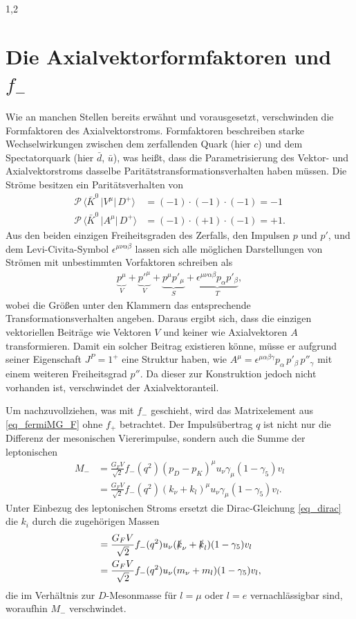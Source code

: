 \documentclass[11pt,a4paper,twoside]{report}
\begin{document}
\begin{spacing}{1,2}
\section{Die Axialvektorformfaktoren und $f_-$}
Wie an manchen Stellen bereits erwähnt und vorausgesetzt, verschwinden die Formfaktoren des Axialvektorstroms. Formfaktoren beschreiben starke 
Wechselwirkungen zwischen dem zerfallenden Quark (hier $c$) und dem Spectatorquark (hier $\bar d$, $\bar u$), was heißt, dass die Parametrisierung des 
Vektor- und Axialvektorstroms dasselbe Paritätstransformationsverhalten haben müssen. Die Ströme besitzen ein Paritätsverhalten von
\begin{align}
 \mathcal{P} \, \big\langle\bar K^0\,\big|V^\mu|\,D^+\big\rangle &= (-1)\cdot(-1)\cdot(-1) = -1 \nonumber \\
 \mathcal{P} \, \big\langle\bar K^0\,\big|A^\mu|\,D^+\big\rangle &= (-1)\cdot(+1)\cdot(-1) = +1. \nonumber
\end{align}
Aus den beiden einzigen Freiheitsgraden des Zerfalls, den Impulsen $p$ und $p'$, und dem Levi-Civita-Symbol $\epsilon^{\mu\nu\alpha\beta}$ lassen sich alle möglichen
Darstellungen von Strömen mit unbestimmten Vorfaktoren schreiben als
\begin{align}
 \underbrace{p^\mu}_{V} + \underbrace{p'^\mu}_{V}+ \underbrace{p^\mu p'_\mu }_{S} + \underbrace{\epsilon^{\mu\nu\alpha\beta}p_\alpha p'_\beta}_{T},
\end{align}
wobei die Größen unter den Klammern das entsprechende Transformationsverhalten angeben. Daraus ergibt sich, dass die einzigen vektoriellen Beiträge wie 
Vektoren $V$ und keiner wie Axialvektoren $A$ transformieren. Damit ein solcher Beitrag existieren könne, müsse er aufgrund seiner Eigenschaft $J^P = 1^+$
eine Struktur haben, wie $A^\mu = \epsilon^{\mu\alpha\beta\gamma}p_\alpha\,p'_\beta\,p''_\gamma$ mit einem weiteren Freiheitsgrad $p''$. Da dieser zur 
Konstruktion jedoch nicht vorhanden ist, verschwindet der Axialvektoranteil.

\noindent
Um nachzuvollziehen, was mit $f_-$ geschieht, wird das Matrixelement aus \eqref{eq_fermiMG_F} ohne $f_+$ betrachtet. Der Impulsübertrag $q$ ist nicht
nur die Differenz der mesonischen Viererimpulse, sondern auch die Summe der leptonischen
\begin{align}
 M_- &= \frac{G_F V}{\sqrt{2}} f_-(q^2)(p_D-p_K)^\mu u_\nu \gamma_\mu(1-\gamma_5)v_l\nonumber\\
 &= \frac{G_F V}{\sqrt{2}} f_-(q^2)(k_\nu+k_l)^\mu u_\nu \gamma_\mu(1-\gamma_5)v_l.\nonumber
\end{align}
Unter Einbezug des leptonischen Stroms ersetzt die Dirac-Gleichung \eqref{eq_dirac} die $k_i$ durch die zugehörigen Massen
\begin{align}
 &=\frac{G_F V}{\sqrt{2}} f_-(q^2)u_\nu (\slashed{k}_\nu + \slashed{k}_l) (1-\gamma_5)v_l\nonumber\\
 &=\frac{G_F V}{\sqrt{2}} f_-(q^2)u_\nu (m_\nu + m_l) (1-\gamma_5)v_l,\nonumber 
 \end{align}
die im Verhältnis zur $D$-Mesonmasse für $l=\mu$ oder $l=e$ vernachlässigbar sind, woraufhin $M_-$ verschwindet.


\end{spacing}
\end{document}
